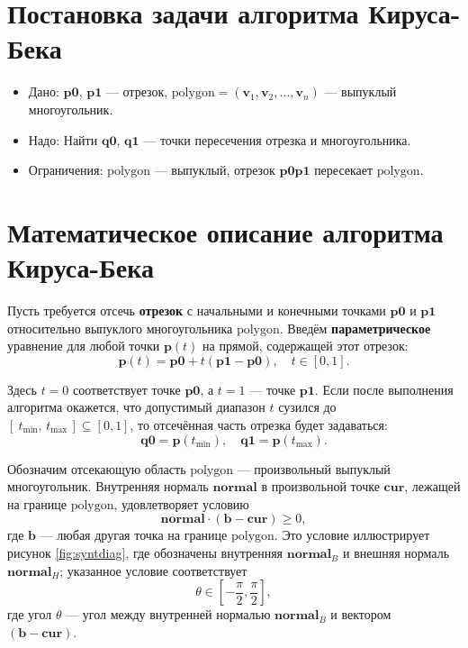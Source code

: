 \documentclass[areasetadvanced]{scrartcl}
\begin{document}
\section{Постановка задачи алгоритма Кируса-Бека}
\begin{itemize}
    \item Дано: \(\mathbf{p0}\), \(\mathbf{p1}\) — отрезок, \(\text{polygon} = (\mathbf{v}_1, \mathbf{v}_2, \dots, \mathbf{v}_n)\) — выпуклый многоугольник.
    \item Надо: Найти \(\mathbf{q0}\), \(\mathbf{q1}\) — точки пересечения отрезка и многоугольника.
    \item Ограничения: \(\text{polygon}\) — выпуклый, отрезок \(\mathbf{p0}\mathbf{p1}\) пересекает \(\text{polygon}\).
\end{itemize}
\newpage
\section{Математическое описание алгоритма Кируса-Бека}
Пусть требуется отсечь \textbf{отрезок} с начальными и конечными точками 
\(\mathbf{p0}\) и \(\mathbf{p1}\) относительно выпуклого многоугольника \(\text{polygon}\).
Введём \textbf{параметрическое} уравнение для любой точки \(\mathbf{p}(t)\)
на прямой, содержащей этот отрезок:
\[
\mathbf{p}(t) = \mathbf{p0} + t(\mathbf{p1} - \mathbf{p0}), 
\quad t \in [0,1].
\]

Здесь \(t = 0\) соответствует точке \(\mathbf{p0}\), а \(t = 1\) — точке 
\(\mathbf{p1}\). Если после выполнения алгоритма окажется, что допустимый диапазон 
\(t\) сузился до \([\ t_{\min},\, t_{\max}\,]\subseteq[0,1]\), то отсечённая часть 
отрезка будет задаваться:
\[
\mathbf{q0} = \mathbf{p}(t_{\min}), 
\quad 
\mathbf{q1} = \mathbf{p}(t_{\max}).
\]

Обозначим отсекающую область \(\text{polygon}\) — произвольный выпуклый многоугольник. Внутренняя нормаль \(\mathbf{normal}\) в произвольной точке \(\mathbf{cur}\), лежащей на границе \(\text{polygon}\), удовлетворяет условию 
\[
\mathbf{normal} \cdot (\mathbf{b} - \mathbf{cur}) \geq 0,
\]
где \(\mathbf{b}\) — любая другая точка на границе \(\text{polygon}\). Это условие иллюстрирует рисунок \ref{fig:syntdiag}, где обозначены внутренняя \(\mathbf{normal}_B\) и внешняя нормаль \(\mathbf{normal}_H\); указанное условие соответствует
\[
\theta \in \left[-\frac{\pi}{2}, \frac{\pi}{2}\right],
\]
где угол \(\theta\) — угол между внутренней нормалью \(\mathbf{normal}_B\) и вектором \((\mathbf{b} - \mathbf{cur})\).
\end{document}
